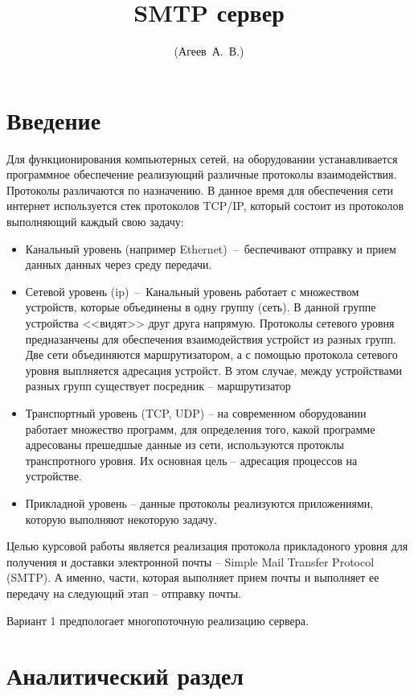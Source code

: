\documentclass[a4paper,12pt]{report}
\title{SMTP сервер\textnumero 1}
\author{(Агеев~А.~В.)}
\begin{document}
	\maketitle

	\tableofcontents

	\chapter*{Введение}
	Для функционирования компьютерных сетей, на оборудовании устанавливается программное обеспечение реализующий различные протоколы взаимодействия. Протоколы различаются по назначению. В данное время для обеспечения сети интернет используется стек протоколов TCP/IP, который состоит из протоколов выполняющий каждый свою задачу:
	\begin{itemize}
		\item Канальный уровень (например Ethernet)~--~беспечивают отправку и прием данных данных через среду передачи.
		\item Сетевой уровень (ip)~--~Канальный уровень работает с множеством устройств, которые объединены в одну группу (сеть). В данной группе устройства <<видят>> друг друга напрямую. Протоколы сетевого уровня предназанчены для обеспечения взаимодействия устройст из разных групп. Две сети объединяются маршрутизатором, а с помощью протокола сетевого уровня выплняется адресация устройст. В этом случае, между устройствами разных групп существует посредник -- маршрутизатор
		\item Транспортный уровень (TCP, UDP) -- на современном оборудовании работает множество программ, для определения того, какой программе адресованы прешедшые данные из сети, используются протоклы транспротного уровня. Их основная цель -- адресация процессов на устройстве.
		\item Прикладной уровень -- данные протоколы реализуются приложениями, которую выполняют некоторую задачу. 
	\end{itemize}

	Целью курсовой работы является реализация протокола прикладоного уровня для получения и доставки электронной почты -- Simple Mail Transfer Protocol (SMTP). А именно, части, которая выполняет прием почты и выполняет ее передачу на следующий этап -- отправку почты. 
	
	Вариант 1 предпологает многопоточную реализацию сервера.

	\chapter{Аналитический раздел}
\end{document}
